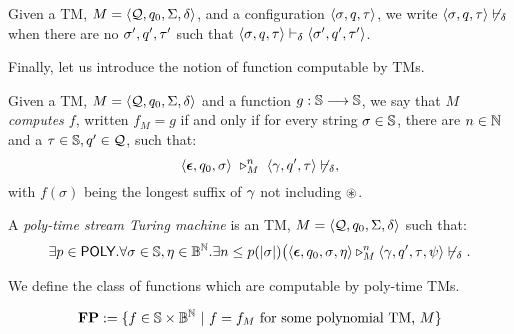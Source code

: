 \begin{notation}
Given a TM,
$M=\langle \textcolor{black}{\mathcal{Q}}, \textcolor{black}{q_0}, \textcolor{black}{\Sigma}, \textcolor{black}{\delta}\rangle$,
and a configuration
$\langle \textcolor{black}{\sigma}, \textcolor{black}{q}, \textcolor{black}{\tau}\rangle$,
we write
$\langle \textcolor{black}{\sigma}, \textcolor{black}{q}, \textcolor{black}{\tau}\rangle \not\vdash_{\delta}$
when there are no $\textcolor{black}{\sigma'}, \textcolor{black}{q'}, \textcolor{black}{\tau'}$
such that
$\langle \textcolor{black}{\sigma}, \textcolor{black}{q}, \textcolor{black}{\tau}\rangle
\vdash_{\delta} \langle \textcolor{black}{\sigma'}, \textcolor{black}{q'},
\textcolor{black}{\tau'}\rangle$.
\end{notation}
%
%
%
\noindent
Finally, let us introduce the notion of function computable by TMs.





\begin{defn}[TM Computation]\label{def:TMcomputation}
Given a TM,
$M = \langle \textcolor{black}{\mathcal{Q}}, \textcolor{black}{q_0}, \textcolor{black}{\Sigma}, \textcolor{black}{\delta}\rangle$
and a function $g: \mathbb{S} \longrightarrow \mathbb{S}$,
we say that
\emph{$M$ computes $f$}, written $f_M = g$ if and only if
for every string $\sigma\in \mathbb{S}$,
there are $n\in \mathbb{N}$
and a $\textcolor{black}{\tau}\in \mathbb{S}, \textcolor{black}{q'} \in \mathcal{Q}$,
such that:
$$
\langle \textcolor{black}{\bm{\epsilon}}, \textcolor{black}{q_0}, \textcolor{black}{\sigma}\rangle
\ \triangleright^n_M \
\langle \textcolor{black}{\gamma}, \textcolor{black}{q'}, \textcolor{black}{\tau}\rangle
\not\vdash_{\delta},
$$
with $f(\sigma)$ being
the longest suffix of $\textcolor{black}{\gamma}$ not including
$\textcolor{black}{\circledast}$.
\end{defn}




\begin{defn}\label{df:PTM}
A \emph{poly-time stream Turing machine}
is an TM,
$M= \langle \textcolor{black}{\mathcal{Q}}, \textcolor{black}{q_0}, \textcolor{black}{\Sigma}, \textcolor{black}{\delta}\rangle$
such that:
$$
\exists p\in \textsf{POLY}.
\forall \textcolor{black}{\sigma} \in \mathbb{S},
\eta \in \mathbb{B}^{\mathbb{N}}.
\exists n \leq p(|\textcolor{black}{\sigma}|)
\big(\langle \textcolor{black}{\bm{\epsilon}},
\textcolor{black}{q_0}, \textcolor{black}{\sigma}, \textcolor{black}{\eta} \rangle
\triangleright^n_{M}
\langle \textcolor{black}{\gamma}, \textcolor{black}{q'}, \textcolor{black}{\tau}, \textcolor{black}{\psi}\rangle \not\vdash_{\delta}.
$$
\end{defn}
%
%
\noindent
We define the class of functions which
are computable by poly-time TMs.


\begin{defn}\label{df:FP}
$$
\mathbf{FP} := \{ f \in \mathbb{S} \times \mathbb{B}^{\mathbb{N}} \ | \
f = f_{M}\text{ for some polynomial TM, $M$}\}
$$

\end{defn}
%
%
\noindent












